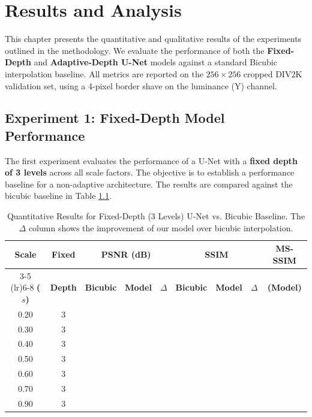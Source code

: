 \chapter{Results and Analysis}
\label{chap:results}

This chapter presents the quantitative and qualitative results of the experiments outlined in the methodology. We evaluate the performance of both the \textbf{Fixed-Depth} and \textbf{Adaptive-Depth U-Net} models against a standard Bicubic interpolation baseline. All metrics are reported on the $256 \times 256$ cropped DIV2K validation set, using a 4-pixel border shave on the luminance (Y) channel.

\section{Experiment 1: Fixed-Depth Model Performance}
\label{sec:results_fixed}

The first experiment evaluates the performance of a U-Net with a \textbf{fixed depth of 3 levels} across all scale factors. The objective is to establish a performance baseline for a non-adaptive architecture. The results are compared against the bicubic baseline in Table \ref{tab:results_fixed_depth}.

\begin{table}[h!]
    \centering
    \caption{Quantitative Results for Fixed-Depth (3 Levels) U-Net vs. Bicubic Baseline. The $\Delta$ column shows the improvement of our model over bicubic interpolation.}
    \label{tab:results_fixed_depth}
    \begin{tabular}{c c | c c c | c c c | c}
        \toprule
        \textbf{Scale} & \textbf{Fixed} & \multicolumn{3}{c}{\textbf{PSNR (dB)}} & \multicolumn{3}{c}{\textbf{SSIM}} & \textbf{MS-SSIM} \\
        \cmidrule(lr){3-5} \cmidrule(lr){6-8}
        \textbf{($s$)} & \textbf{Depth} & \textbf{Bicubic} & \textbf{Model} & \textbf{$\Delta$} & \textbf{Bicubic} & \textbf{Model} & \textbf{$\Delta$} & \textbf{(Model)} \\
        \midrule
        0.20 & 3 & & & & & & & \\
        0.30 & 3 & & & & & & & \\
        0.40 & 3 & & & & & & & \\
        0.50 & 3 & & & & & & & \\
        0.60 & 3 & & & & & & & \\
        0.70 & 3 & & & & & & & \\
        0.90 & 3 & & & & & & & \\
        \bottomrule
    \end{tabular}
\end{table}

